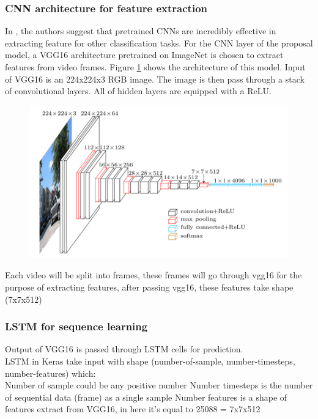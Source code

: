 \subsubsection{CNN architecture for feature extraction}
In \cite{DBLP:journals/corr/ZhouKLOT14}, the authors suggest that pretrained CNNs are incredibly effective in extracting feature for other classification tasks.
For the CNN layer of the proposal model, a VGG16 \cite{DBLP:journals/corr/SimonyanZ14a} architecture pretrained on ImageNet  is chosen to extract features from video frames. Figure \ref{chap3:vgg16_architecture} shows the architecture of this model. Input of VGG16 is an 224x224x3 RGB image. The image is then pass through a stack of convolutional layers. All of hidden layers are equipped with a ReLU.  
\begin{center}
    \begin{figure}[H]
    \centering
    \includegraphics[width=1\columnwidth]{images/chap3/vgg16_architecture.png}
    \footcaption{}
    \label{chap3:vgg16_architecture}
    \end{figure}
\end{center}

Each video will be split into frames, these frames will go through vgg16 for the purpose of extracting features, after passing vgg16, these features take shape (7x7x512)

\subsubsection{LSTM for sequence learning}
Output of VGG16 is passed through LSTM cells for prediction.\\
LSTM in Keras take input with shape (number-of-sample, number-timesteps, number-features) which:\\
Number of sample could be any positive number
Number timesteps is the number of sequential data (frame) as a single sample
Number features is a shape of features extract from VGG16, in here it's equal to 25088 = 7x7x512\\


